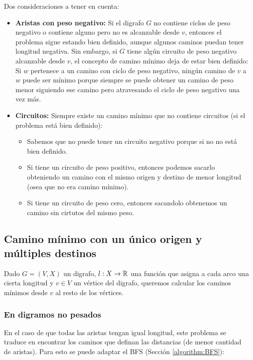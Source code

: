 Dos consideraciones a tener en cuenta:
\begin{itemize}
  \item \textbf{Aristas con peso negativo:} Si el digrafo \(G\) no contiene ciclos de peso negativo o contiene alguno pero no es alcanzable desde \(v\), entonces el problema sigue estando bien definido, aunque algunos caminos puedan tener longitud negativa. Sin embargo, si \(G\) tiene algún circuito de peso negativo alcanzable desde \(v\), el concepto de camino mínimo deja de estar bien definido: Si \(w\) pertenece a un camino con ciclo de peso negativo, ningún camino de \(v\) a \(w\) puede ser mínimo porque siempre se puede obtener un camino de peso menor siguiendo ese camino pero atravesando el ciclo de peso negativo una vez más.
  \item \textbf{Circuitos:} Siempre existe un camino mínimo que no contiene circuitos (si el problema está bien definido):
        \begin{itemize}
          \item Sabemos que no puede tener un circuito negativo porque si no no está bien definido.
          \item Si tiene un circuito de peso positivo, entonces podemos sacarlo obteniendo un camino con el mismo origen y destino de menor longitud (osea que no era camino mínimo).
          \item Si tiene un circuito de peso cero, entonces sacandolo obtenemos un camino sin cirtutos del mismo peso.
        \end{itemize}
\end{itemize}

\subsection{Camino mínimo con un único origen y múltiples destinos}
Dado \(G = (V, X)\) un digrafo, \(l: X\to\mathbb{R}\) una función que asigna a cada arco una cierta longitud y \(v\in V\) un vértice del digrafo, queremos calcular los caminos mínimos desde \(v\) al resto de los vértices.

\subsubsection{En digramos no pesados}
En el caso de que todas las aristas tengan igual longitud, este problema se traduce en encontrar los caminos que definan las distancias (de menor cantidad de aristas). Para esto se puede adaptar el BFS (Sección \ref{algorithm:BFS}):

